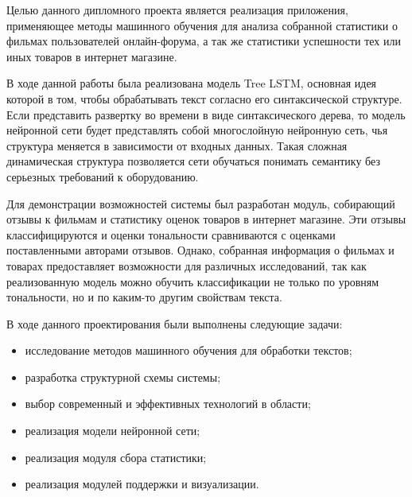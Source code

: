 Целью данного дипломного проекта является реализация приложения, применяющее методы машинного обучения для анализа собранной статистики о фильмах пользователей онлайн-форума, а так же статистики успешности тех или иных товаров в интернет магазине.

В ходе данной работы была реализована модель Tree LSTM, основная идея которой в том, чтобы обрабатывать текст согласно его синтаксической структуре. Если представить развертку во времени в виде синтаксического дерева, то модель нейронной сети будет представлять собой многослойную нейронную сеть, чья структура меняется в зависимости от входных данных. Такая сложная динамическая структура позволяется сети обучаться понимать семантику без серьезных требований к оборудованию.

Для демонстрации возможностей системы был разработан модуль, собирающий отзывы к фильмам и статистику оценок товаров в интернет магазине. Эти отзывы классифицируются и оценки тональности сравниваются с оценками поставленными авторами отзывов. Однако, собранная информация о фильмах и товарах предоставляет возможности для различных исследований, так как реализованную модель можно обучить классификации не только по уровням тональности, но и по каким-то другим свойствам текста.

В ходе данного проектирования были выполнены следующие задачи:
\begin{itemize}
\item исследование методов машинного обучения для обработки текстов;
\item разработка структурной схемы системы;
\item выбор современный и эффективных технологий в области;
\item реализация модели нейронной сети;
\item реализация модуля сбора статистики;
\item реализация модулей поддержки и визуализации.
\end{itemize}